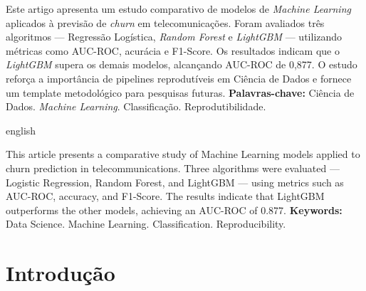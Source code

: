 \documentclass[
    article,
    12pt,
    oneside,
    a4paper,
    english,
    brazilian
    ]{abntex2}
\numberwithin{equation}{section}
\begin{document}
\pretextual
\maketitle
\newpage

\begin{resumo}
\noindent Este artigo apresenta um estudo comparativo de modelos de \textit{Machine Learning} aplicados à previsão de \textit{churn} em telecomunicações. Foram avaliados três algoritmos --- Regressão Logística, \textit{Random Forest} e \textit{LightGBM} --- utilizando métricas como AUC-ROC, acurácia e F1-Score. Os resultados indicam que o \textit{LightGBM} supera os demais modelos, alcançando AUC-ROC de 0,877. O estudo reforça a importância de pipelines reprodutíveis em Ciência de Dados e fornece um template metodológico para pesquisas futuras.
\newline
\noindent \textbf{Palavras-chave:} Ciência de Dados. \textit{Machine Learning}. Classificação. Reprodutibilidade.
\end{resumo}

\begin{otherlanguage*}{english}
\begin{resumo}[Abstract]
\noindent This article presents a comparative study of Machine Learning models applied to churn prediction in telecommunications. Three algorithms were evaluated --- Logistic Regression, Random Forest, and LightGBM --- using metrics such as AUC-ROC, accuracy, and F1-Score. The results indicate that LightGBM outperforms the other models, achieving an AUC-ROC of 0.877. 
\newline
\noindent \textbf{Keywords:} Data Science. Machine Learning. Classification. Reproducibility.
\end{resumo}
\end{otherlanguage*}
\newpage

\textual

\section{Introdução}
\end{document}
